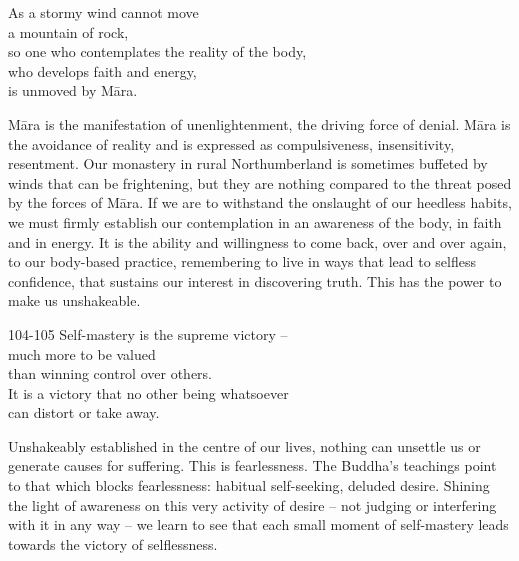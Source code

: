 
\begin{dhpVerse}{8}
\label{dhp-8}
As a stormy wind cannot move\\
a mountain of rock,\\
so one who contemplates the reality of the body,\\
who develops faith and energy,\\
is unmoved by Māra.
\end{dhpVerse}

\begin{dhpRefl}

Māra is the manifestation of unenlightenment, the driving force of
denial. Māra is the avoidance of reality and is expressed as
compulsiveness, insensitivity, resentment. Our monastery in rural
Northumberland is sometimes buffeted by winds that can be frightening,
but they are nothing compared to the threat posed by the forces of
Māra. If we are to withstand the onslaught of our heedless habits, we
must firmly establish our contemplation in an awareness of the body,
in faith and in energy. It is the ability and willingness to come
back, over and over again, to our body-based practice, remembering to
live in ways that lead to selfless confidence, that sustains our
interest in discovering truth. This has the power to make us
unshakeable.

\end{dhpRefl}


\begin{dhpVerse}{104-105}
\label{dhp-104}\label{dhp-105}
Self-mastery is the supreme victory --\\
much more to be valued\\
than winning control over others.\\
It is a victory that no other being whatsoever\\
can distort or take away.
\end{dhpVerse}

\begin{dhpRefl}

Unshakeably established in the centre of our lives, nothing can
unsettle us or generate causes for suffering. This is fearlessness.
The Buddha's teachings point to that which blocks fearlessness:
habitual self-seeking, deluded desire. Shining the light of awareness
on this very activity of desire -- not judging or interfering with it
in any way -- we learn to see that each small moment of self-mastery
leads towards the victory of selflessness.

\end{dhpRefl}

